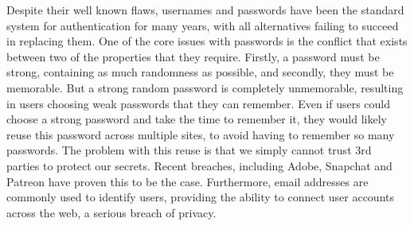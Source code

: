 Despite their well known flaws, usernames and passwords have been the standard system for authentication for many years, with all alternatives failing to succeed in replacing them. One of the core issues with passwords is the conflict that exists between two of the properties that they require. Firstly, a password must be strong, containing as much randomness as possible, and secondly, they must be memorable. But a strong random password is completely unmemorable, resulting in users choosing weak passwords that they can remember. Even if users could choose a strong password and take the time to remember it, they would likely reuse this password across multiple sites, to avoid having to remember so many passwords. The problem with this reuse is that we simply cannot trust 3rd parties to protect our secrets. Recent breaches, including Adobe, Snapchat and Patreon have proven this to be the case. Furthermore, email addresses are commonly used to identify users, providing the ability to connect user accounts across the web, a serious breach of privacy.
